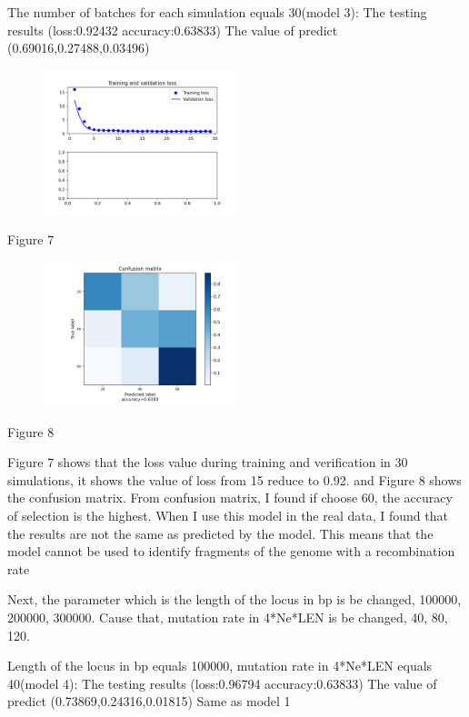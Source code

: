\documentclass[11pt,a4 paper,title page]{article}
\begin{document}
The number of batches for each simulation equals 30(model 3):
\hfill\break 
The testing results (loss:0.92432 accuracy:0.63833)
\hfill\break 
The value of predict (0.69016,0.27488,0.03496)
\begin{figure}[H]
\centering
\includegraphics[width=0.5\textwidth,angle=360]{../picture/figure7.png}
\end{figure}
\centerline{Figure 7}
\hfill\break 
\begin{figure}[H]
\centering
\includegraphics[width=0.5\textwidth,angle=360]{../picture/figure8.png}
\end{figure}
\centerline{Figure 8}
\hfill\break 
Figure 7 shows that the loss value during training and verification in 30 simulations, it shows the value of loss from 15 reduce to 0.92. and Figure 8 shows the confusion matrix. From confusion matrix, I found if choose 60, the accuracy of selection is the highest. When I use this model in the real data, I found that the results are not the same as predicted by the model. This means that the model cannot be used to identify fragments of the genome with a recombination rate
\hfill\break 

Next, the parameter which is the length of the locus in bp is be changed, 100000, 200000, 300000. Cause that, mutation rate in 4*Ne*LEN is be changed, 40, 80, 120.
\hfill\break 

Length of the locus in bp equals 100000, mutation rate in 4*Ne*LEN equals 40(model 4):
\hfill\break 
The testing results (loss:0.96794 accuracy:0.63833)
\hfill\break 
The value of predict (0.73869,0.24316,0.01815)
\hfill\break 
Same as model 1
\hfill\break 
\end{document}
